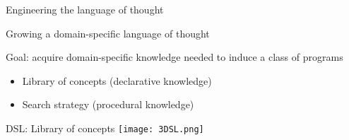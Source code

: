 \documentclass{beamer}
\begin{document}
\begin{frame}{Engineering the language of thought}
\end{frame}



\begin{frame}{Growing a domain-specific language of thought}
  
  Goal: acquire domain-specific knowledge needed to induce a class of programs


  
  \pause
  \vspace{1cm}

  \begin{itemize}
  \item Library of concepts (declarative knowledge)
    \item Search strategy (procedural knowledge)
    \end{itemize}
\end{frame}

\begin{frame}{DSL: Library of concepts}
\texttt{[image: 3DSL.png]}
\end{frame}
\end{document}
